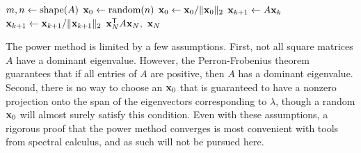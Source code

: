 \begin{algorithm}[H] %
\begin{algorithmic}[1]
    \State $m, n \gets \mathrm{shape}(A)$
    \State $\mathbf{x}_0 \gets \text{random}(n)$
    \State $\mathbf{x}_0 \gets \mathbf{x}_0/\|\mathbf{x}_0\|_2$
        \label{step:power-method-stopping-criterion}
        \State $\mathbf{x}_{k+1} \gets A\mathbf{x}_k$
        \label{step:power-method-main-step}
        \State $\mathbf{x}_{k+1} \gets \mathbf{x}_{k+1}/\|\mathbf{x}_{k+1}\|_2$
    \EndFor
    \State {} $\mathbf{x}_N^{\mathsf T} A \mathbf{x}_N,\ \mathbf{x}_N$
\EndProcedure
\end{algorithmic}
\caption{}
\label{Alg:power-method}
\end{algorithm}

The power method is limited by a few assumptions.
First, not all square matrices $A$ have a dominant eigenvalue.
However, the Perron-Frobenius theorem guarantees that if all entries of $A$ are positive, then $A$ has a dominant eigenvalue.
Second, there is no way to choose an $\mathbf{x}_0$ that is guaranteed to have a nonzero projection onto the span of the eigenvectors corresponding to $\lambda$, though a random $\mathbf{x}_0$ will almost surely satisfy this condition.
Even with these assumptions, a rigorous proof that the power method converges is most convenient with tools from spectral calculus, and as such will not be pursued here.

